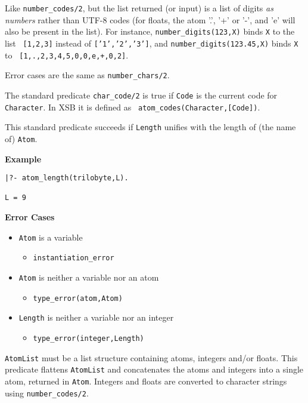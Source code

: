 \begin{description}
Like \verb|number_codes/2|, but the list returned (or input) is a list
of digits \emph{as numbers} rather than UTF-8 codes (for floats, the
atom '.', '+' or '-', and 'e' will also be present in the list). For
instance, \verb|number_digits(123,X)| binds {\tt X} to the list {\tt
  [1,2,3]} instead of {\tt ['1','2','3']}, and
\verb|number_digits(123.45,X)| binds {\tt X} to {\tt
  [1,.,2,3,4,5,0,0,e,+,0,2]}.

Error cases are the same as {\tt number\_chars/2}.

%
The standard predicate {\tt char\_code/2} is true if {\tt Code} is the
current code for {\tt Character}.  In XSB it is defined as {\tt
  atom\_codes(Character,[Code])}.

%
This standard predicate succeeds if {\tt Length} unifies with the
length of (the name of) {\tt Atom}.

{\bf Example}
{\small
\begin{verbatim}
|?- atom_length(trilobyte,L).

L = 9
\end{verbatim}
}

{\bf Error Cases}
\begin{itemize}
  \item {\tt Atom} is a variable
\begin{itemize}
\item {\tt instantiation\_error}
\end{itemize}
\item {\tt Atom} is neither a variable nor an atom
\begin{itemize}      
\item   {\tt type\_error(atom,Atom)}
\end{itemize}
\item {\tt Length} is neither a variable nor an integer
\begin{itemize}      
\item   {\tt type\_error(integer,Length)}
\end{itemize}
\end{itemize}

%
{\tt AtomList} must be a list structure containing atoms, integers
and/or floats.  This predicate flattens {\tt AtomList} and
concatenates the atoms and integers into a single atom, returned in
{\tt Atom}.  Integers and floats are converted to character strings
using {\tt number\_codes/2}.


\end{description}
